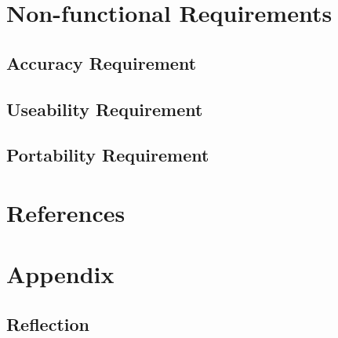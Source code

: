 \documentclass[12pt]{article}
\begin{document}
\section{Non-functional Requirements}
\subsection{Accuracy Requirement}

\subsection{Useability Requirement}

\subsection{Portability Requirement}

\section{References}

\section{Appendix}
\subsection{Reflection}
\end{document}
